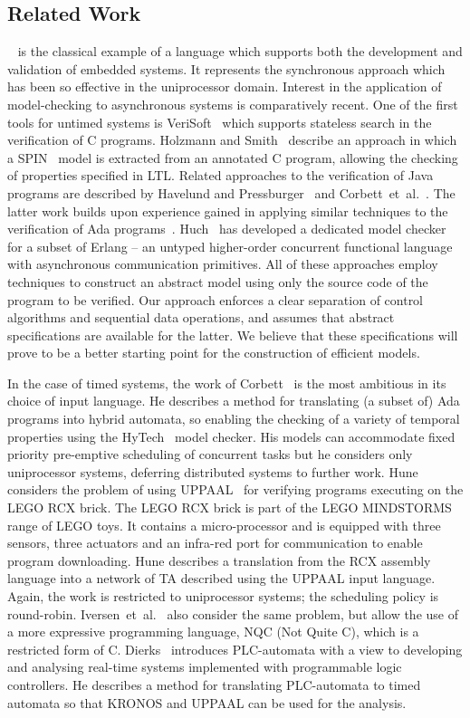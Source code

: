 \subsection{Related Work}
\esterel~\cite{bg:92} is the classical example of a language which
supports both the development and validation of embedded systems.  It
represents the synchronous approach which has been so effective in the
uniprocessor domain. Interest in the application of model-checking to
asynchronous systems is comparatively recent. One of the first tools
for untimed systems is VeriSoft~\cite{god:97} which supports stateless
search in the verification of C programs. Holzmann and
Smith~\cite{hs:99} describe an approach in which a SPIN~\cite{hol:97}
model is extracted from an annotated C program, allowing the checking
of properties specified in LTL.  Related approaches to the
verification of Java programs are described by Havelund and
Pressburger~\cite{hp:00} and Corbett~et~al.~\cite{cdh:00}.  The
latter work builds upon experience gained in applying similar
techniques to the verification of Ada programs~\cite{dpc:98}.
Huch~\cite{huc:99} has developed a dedicated model checker for a
subset of Erlang -- an untyped higher-order concurrent functional
language with asynchronous communication primitives. All of these
approaches employ techniques to construct an abstract model using only
the source code of the program to be verified. Our approach enforces a
clear separation of control algorithms and sequential data operations,
and assumes that abstract specifications are available for the latter.
We believe that these specifications will prove to be a better
starting point for the construction of efficient models.

In the case of timed systems, the work of Corbett~\cite{cor:96} is the
most ambitious in its choice of input language.  He describes a method
for translating (a subset of) Ada programs into hybrid automata, so
enabling the checking of a variety of temporal properties using the
HyTech~\cite{hhw:97} model checker. His models can accommodate fixed
priority pre-emptive scheduling of concurrent tasks but he considers
only uniprocessor systems, deferring distributed systems to further
work. Hune~\cite{hun:99} considers the problem of using
UPPAAL~\cite{lpy:97} for verifying programs executing on the LEGO RCX
brick. The LEGO RCX brick is part of the LEGO MINDSTORMS range of LEGO
toys. It contains a micro-processor and is equipped with three
sensors, three actuators and an infra-red port for communication to
enable program downloading.  Hune describes a translation from the RCX
assembly language into a network of TA described using the UPPAAL
input language. Again, the work is restricted to uniprocessor systems;
the scheduling policy is round-robin.  Iversen~et~al.~\cite{ikl:00}
also consider the same problem, but allow the use of a more expressive
programming language, NQC (Not Quite C), which is a restricted form of
C. Dierks~\cite{die:01} introduces PLC-automata with a view to
developing and analysing real-time systems implemented with
programmable logic controllers. He describes a method for translating
PLC-automata to timed automata so that KRONOS and UPPAAL can be used
for the analysis. 

